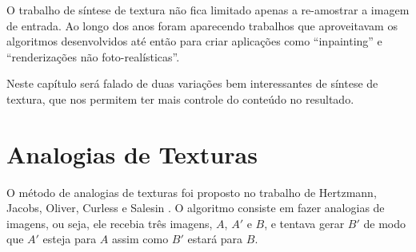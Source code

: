 O trabalho de síntese de textura
não fica limitado apenas a re-amostrar
a imagem de entrada. Ao longo
dos anos foram aparecendo trabalhos
que aproveitavam os algoritmos
desenvolvidos até então para
criar aplicações como ``inpainting''
e ``renderizações não foto-realísticas''.



Neste capítulo será falado de duas
variações bem interessantes de síntese
de textura, que nos permitem ter mais
controle do conteúdo no resultado.


\section{Analogias de Texturas}

O método de analogias de texturas
foi proposto no trabalho de 
Hertzmann, Jacobs, Oliver, Curless
e Salesin \cite{Hertzmann2001}.
O algoritmo consiste em fazer analogias
de imagens, ou seja, ele
recebia três imagens, $A$, $A'$ e $B$,
e tentava gerar $B'$ de modo que
$A'$ esteja para $A$ assim como
$B'$ estará para $B$.


